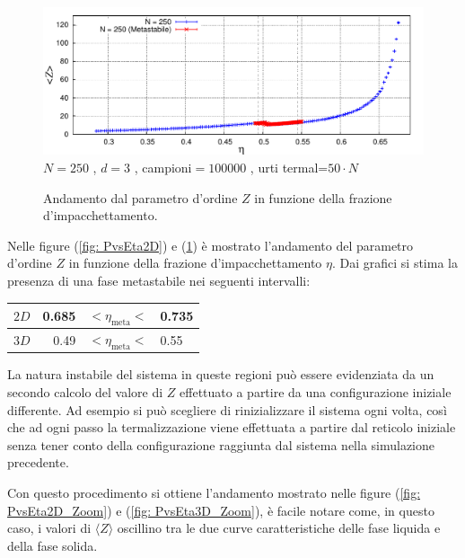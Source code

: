 \documentclass[11pt]{article}
\theoremstyle{plain}
\theoremstyle{remark}
\begin{document}
\begin{figure}[htbp]
\centering
\caption[Sfere Rigide$/$PvsEta\_3D.cpp]{Andamento dal parametro d'ordine $Z$ in funzione della frazione d'impacchettamento.}	\vspace{-15pt}
\includegraphics[scale=0.9]{Immagini/Rigide/PvsEta3D}
	\newline \footnotesize{$N= 250$ , $d=3$ , campioni$= 100000$ ,  urti termal=$ 50 \cdot N$}
	\label{fig: PvsEta3D}
\end{figure}
Nelle figure (\ref{fig: PvsEta2D}) e (\ref{fig: PvsEta3D}) è mostrato l'andamento del parametro d'ordine $Z$ in funzione della frazione d'impacchettamento $\eta$.
Dai grafici si stima la presenza di una fase metastabile nei seguenti intervalli:

\begin{center}
\begin{tabular}{|c|r c l |}
\hline
	$2D$ & 0.685 & $<\eta_{\textrm{meta}}<$ & 0.735 \\
\hline
	$3D$ & 0.49 & $<\eta_{\textrm{meta}}<$ & 0.55\\
\hline
\end{tabular}
\end{center}
La natura instabile del sistema in queste regioni può essere evidenziata da un secondo calcolo del valore di $Z$ effettuato a partire da una configurazione iniziale differente.
Ad esempio si può scegliere di rinizializzare il sistema ogni volta, così che ad ogni passo la termalizzazione viene effettuata a partire dal reticolo iniziale senza tener conto della configurazione raggiunta dal sistema nella simulazione precedente.

Con questo procedimento si ottiene l'andamento mostrato nelle figure (\ref{fig: PvsEta2D_Zoom}) e (\ref{fig: PvsEta3D_Zoom}), è facile notare come, in questo caso, i valori di $\langle Z \rangle$  oscillino tra le due curve caratteristiche delle fase liquida e della fase solida.
\end{document}
